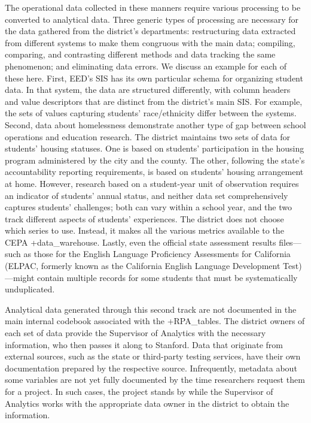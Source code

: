 \documentclass[
]{book}
\begin{document}
The operational data collected in these manners require various processing to be converted to analytical data. Three generic types of processing are necessary for the data gathered from the district's departments: restructuring data extracted from different systems to make them congruous with the main data; compiling, comparing, and contrasting different methods and data tracking the same phenomenon; and eliminating data errors. We discuss an example for each of these here. First, EED's SIS has its own particular schema for organizing student data. In that system, the data are structured differently, with column headers and value descriptors that are distinct from the district's main SIS. For example, the sets of values capturing students' race/ethnicity differ between the systems. Second, data about homelessness demonstrate another type of gap between school operations and education research. The district maintains two sets of data for students' housing statuses. One is based on students' participation in the housing program administered by the city and the county. The other, following the state's accountability reporting requirements, is based on students' housing arrangement at home. However, research based on a student-year unit of observation requires an indicator of students' annual status, and neither data set comprehensively captures students' challenges; both can vary within a school year, and the two track different aspects of students' experiences. The district does not choose which series to use. Instead, it makes all the various metrics available to the CEPA +data\_warehouse\textbar. Lastly, even the official state assessment results files---such as those for the English Language Proficiency Assessments for California (ELPAC, formerly known as the California English Language Development Test)---might contain multiple records for some students that must be systematically unduplicated.

Analytical data generated through this second track are not documented in the main internal codebook associated with the +RPA\_tables\textbar. The district owners of each set of data provide the Supervisor of Analytics with the necessary information, who then passes it along to Stanford. Data that originate from external sources, such as the state or third-party testing services, have their own documentation prepared by the respective source. Infrequently, metadata about some variables are not yet fully documented by the time researchers request them for a project. In such cases, the project stands by while the Supervisor of Analytics works with the appropriate data owner in the district to obtain the information.
\end{document}
